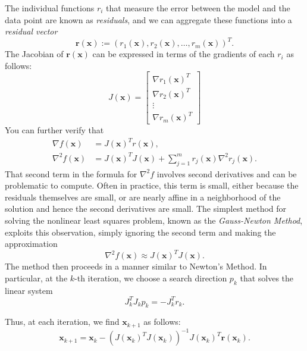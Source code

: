 The individual functions $r_i$ that measure the error between the model and the data point are known as \emph{residuals},
and we can aggregate these functions into a \emph{residual vector}
$$
\mathbf{r}(\mathbf{x}) := (r_1(\mathbf{x}), r_2(\mathbf{x}), \ldots, r_m(\mathbf{x}))^T.
$$
The Jacobian of $\mathbf{r}(\mathbf{x})$ can be expressed in terms of the gradients of each $r_i$ as follows:
$$
J(\mathbf{x}) = \begin{bmatrix} \nabla r_1(\mathbf{x})^T \\ \nabla r_2(\mathbf{x})^T \\ \vdots \\ \nabla r_m(\mathbf{x})^T \end{bmatrix}
$$
You can further verify that
\begin{align*}
\nabla f(\mathbf{x}) &= J(\mathbf{x})^T r(\mathbf{x}), \\
\nabla^2 f(\mathbf{x}) &= J(\mathbf{x})^TJ(\mathbf{x}) + \displaystyle \sum_{j=1}^m r_j(\mathbf{x}) \nabla^2r_j(\mathbf{x}).
\end{align*}
That second term in the formula for $\nabla^2 f$ involves second derivatives and can be problematic to compute. Often in practice,
this term is small, either because the residuals themselves are small, or are nearly affine in a neighborhood of the solution and
hence the second derivatives are small.
The simplest method for solving the nonlinear least squares problem, known as the \emph{Gauss-Newton Method}, exploits this
observation, simply ignoring the second term and making the approximation
$$
\nabla^2 f(\mathbf{x}) \approx J(\mathbf{x})^TJ(\mathbf{x}).
$$
The method then proceeds in a manner similar to Newton's Method. In particular, at the $k$-th iteration, we choose a search
direction $p_k$ that solves the linear system
$$
J_k^TJ_kp_k = -J_k^Tr_k.
$$

Thus, at each iteration, we find $\mathbf{x}_{k+1}$ as follows:
\begin{equation} \label{Eq:GaussNewtonUpdate}
\mathbf{x}_{k+1} = \mathbf{x}_k-(J(\mathbf{x}_k)^TJ(\mathbf{x}_k))^{-1}J( \mathbf{x}_k)^T \mathbf{r}( \mathbf{x}_k).
\end{equation}

\begin{comment}
For convenience, we summarize these steps in Algorithm \ref{alg:guassnewton}.

\begin{algorithm}
\begin{algorithmic}[1]
\Procedure{Gauss-Newton}{}
    \State \textrm{Choose initial parameter vector } $x_0$
    \State $k \gets 0$
    \While{$J_k^Tr_k \neq 0$}
        \State \textrm{solve } $J_k^TJ_kp_k = -J_k^Tr_k$
        \State \textrm{choose step size } $\alpha_k$ \textrm{ satisfying Wolfe Conditions.}
        \State $x_{k+1} \gets x_k + \alpha_kp_k$
        \State $k \gets k+1$
    \EndWhile
\EndProcedure
\end{algorithmic}
\caption{Gauss-Newton Method}
\label{alg:guassnewton}
\end{algorithm}
\end{comment}


